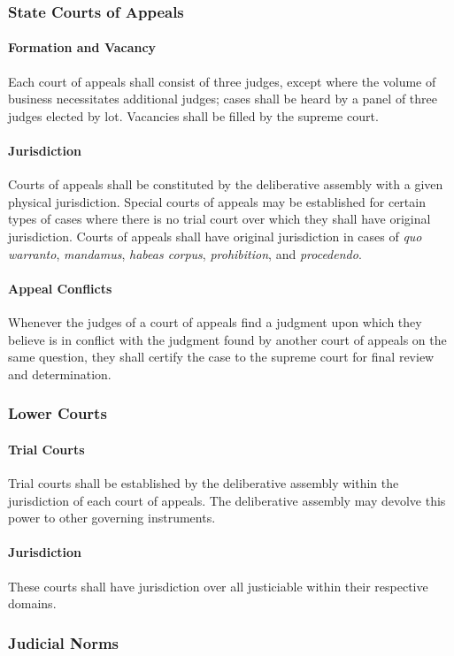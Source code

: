 \documentclass{article}
\begin{document}
\subsubsection{State Courts of Appeals}
\paragraph{Formation and Vacancy}
Each court of appeals shall consist of three judges, except where the volume of business necessitates additional judges; cases shall be heard by a panel of three judges elected by lot. Vacancies shall be filled by the supreme court.
\paragraph{Jurisdiction}
Courts of appeals shall be constituted by the deliberative assembly with a given physical jurisdiction. Special courts of appeals may be established for certain types of cases where there is no trial court over which they shall have original jurisdiction. Courts of appeals shall have original jurisdiction in cases of \textit{quo warranto}, \textit{mandamus}, \textit{habeas corpus}, \textit{prohibition}, and \textit{procedendo}.
\paragraph{Appeal Conflicts}
Whenever the judges of a court of appeals find a judgment upon which they believe is in conflict with the judgment found by another court of appeals on the same question, they shall certify the case to the supreme court for final review and determination. 
\subsubsection{Lower Courts}
\paragraph{Trial Courts}
Trial courts shall be established by the deliberative assembly within the jurisdiction of each court of appeals. The deliberative assembly may devolve this power to other governing instruments.
\paragraph{Jurisdiction}
These courts shall have jurisdiction over all justiciable within their respective domains.
\subsubsection{Judicial Norms}
\end{document}
